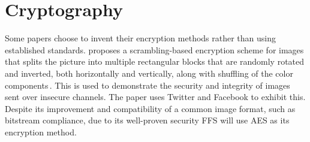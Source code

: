 \section{Cryptography}
\label{sec:rel_crypto}
Some papers choose to invent their encryption methods rather than using established standards. \citeauthor{chumanEncryptionThenCompressionSystemsUsing2019} proposes a scrambling-based encryption scheme for images that splits the picture into multiple rectangular blocks that are randomly rotated and inverted, both horizontally and vertically, along with shuffling of the color components\,\cite{chumanEncryptionThenCompressionSystemsUsing2019}. This is used to demonstrate the security and integrity of images sent over insecure channels. The paper uses Twitter and Facebook to exhibit this. Despite its improvement and compatibility of a common image format, such as bitstream compliance, due to its well-proven security FFS will use AES as its encryption method. 